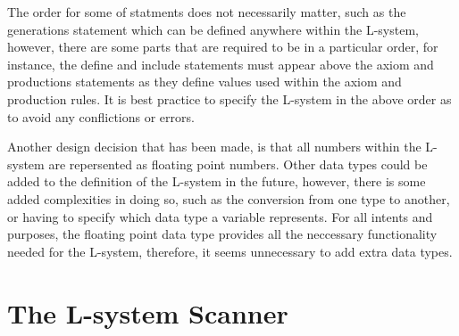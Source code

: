 \begin{flushleft}
\vspace{5mm}

The order for some of statments does not necessarily matter, such as the generations statement which can be defined anywhere within the L-system, however, there are some parts that are required to be in a particular order, for instance, the define and include statements must appear above the axiom and productions statements as they define values used within the axiom and production rules. It is best practice to specify the L-system in the above order as to avoid any conflictions or errors. \\

\vspace{5mm}

Another design decision that has been made, is that all numbers within the L-system are repersented as floating point numbers. Other data types could be added to the definition of the L-system in the future, however, there is some added complexities in doing so, such as the conversion from one type to another, or having to specify which data type a variable represents. For all intents and purposes, the floating point data type provides all the neccessary functionality needed for the L-system, therefore, it seems unnecessary to add extra data types. \\

\end{flushleft}

\section{The L-system Scanner} \label{Flex}

